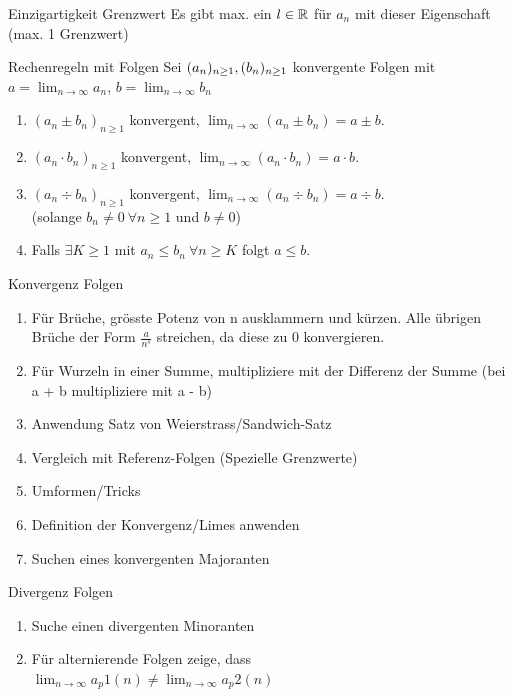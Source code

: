 \begin{lemma}{Einzigartigkeit Grenzwert}
    Es gibt max. ein $l \in \R$ für $a_n$ mit dieser Eigenschaft (max. 1 Grenzwert)
\end{lemma}

\begin{theorem}{Rechenregeln mit Folgen}
    Sei $\sequence,\sequence[b]$ konvergente Folgen mit$a = \lim_{n \to \infty} a_n$, $b = \lim_{n \to \infty} b_n$
    \begin{enumerate}
        \item $(a_n \pm b_n)_{n \geq 1}$ konvergent, $\lim_{n \to \infty} (a_n \pm b_n) = a \pm b$.
        \item $(a_n \cdot b_n)_{n \geq 1}$ konvergent, $\lim_{n \to \infty} (a_n \cdot b_n) = a \cdot b$.
        \item $(a_n \div  b_n)_{n \geq 1}$ konvergent, $\lim_{n \to \infty} (a_n \div b_n) = a \div b$.
        \\(solange $b_n \neq 0 ~ \forall n \geq 1$ und $b \neq 0$)
        \item Falls $\exists K \geq 1$ mit $a_n \leq b_n ~ \forall n \geq K$ folgt $a \leq b$.
    \end{enumerate}
\end{theorem}

\begin{KR}{Konvergenz Folgen}
    \begin{enumerate}
        \item Für Brüche, grösste Potenz von n ausklammern und kürzen. Alle übrigen Brüche der Form $\frac{a}{n^s}$ streichen, da diese zu 0 konvergieren.
        \item Für Wurzeln in einer Summe, multipliziere mit der Differenz der Summe (bei a + b multipliziere mit a - b)
        \item Anwendung Satz von Weierstrass/Sandwich-Satz 
        \item Vergleich mit Referenz-Folgen (Spezielle Grenzwerte)
        \item Umformen/Tricks
        \item Definition der Konvergenz/Limes anwenden
        \item Suchen eines konvergenten Majoranten
    \end{enumerate}
\end{KR}

\begin{KR}{Divergenz Folgen}
    \begin{enumerate}
        \item  Suche einen divergenten Minoranten
        \item Für alternierende Folgen zeige, dass \\$\lim_{n \to \infty} a_p1(n) \neq \lim_{n \to \infty} a_p2(n)$
    \end{enumerate}
\end{KR}

